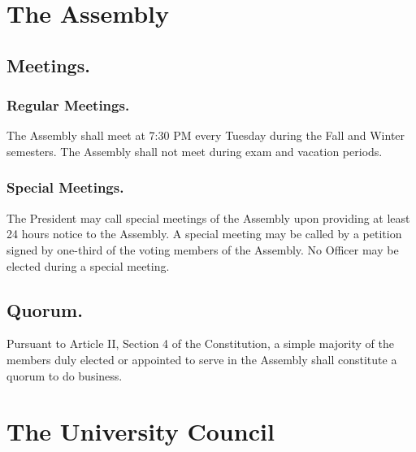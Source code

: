 
\section{The Assembly}

\subsection{Meetings.}

\subsubsection{Regular Meetings.}
The Assembly shall meet at 7:30 PM every Tuesday during the Fall and Winter semesters. The Assembly shall not meet during exam and vacation periods.
\subsubsection{Special Meetings.}
The President may call special meetings of the Assembly upon providing at least 24 hours notice to the Assembly. A special meeting may be called by a petition signed by one-third of the voting members of the Assembly. No Officer may be elected during a special meeting.

\subsection{Quorum.}
Pursuant to Article II, Section 4 of the Constitution, a simple majority of the members duly elected or appointed to serve in the Assembly shall constitute a quorum to do business.

\section{The University Council}
